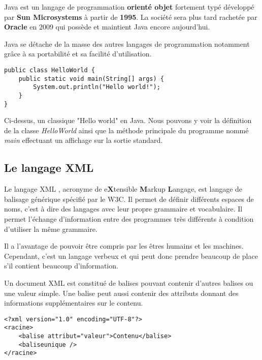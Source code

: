 \par 
Java \cite{java_oracle} est un langage de programmation \textbf{orienté objet} fortement typé développé par \textbf{Sun Microsystems} à partir de \textbf{1995}. La société sera plus tard rachetée par \textbf{Oracle} en 2009 qui possède et maintient Java encore aujourd'hui.

\par 
Java se détache de la masse des autres langages de programmation notamment grâce à sa portabilité et sa facilité d'utilisation.

\begin{lstlisting}[caption=Hello world en java]
public class HelloWorld {
    public static void main(String[] args) {
        System.out.println("Hello world!");
    }
}
\end{lstlisting}

\par
Ci-dessus, un classique "Hello world" en Java. Nous pouvons y voir la définition de la classe \emph{HelloWorld} ainsi que la méthode principale du programme nommé \emph{main} effectuant un affichage sur la sortie standard.



\subsection{Le langage XML}

Le langage XML \cite{xml_w3c, xml_ocr}, acronyme de e\textbf{X}tensible \textbf{M}arkup \textbf{L}angage, est langage de balisage générique spécifié par le W3C. Il permet de définir différents espaces de noms, c'est à dire des langages avec leur propre grammaire et vocabulaire. Il permet l'échange d'information entre des programmes très différents à condition d'utiliser la même grammaire.

\par
Il a l'avantage de pouvoir être compris par les êtres humains et les machines. Cependant, c'est un langage verbeux et qui peut donc prendre beaucoup de place s'il contient beaucoup d'information.

\par
Un document XML est constitué de balises pouvant contenir d'autres balises ou une valeur simple. Une balise peut aussi contenir des attributs donnant des informations supplémentaires sur le contenu.

\begin{lstlisting}[caption=Exemple d'un document XML]
<?xml version="1.0" encoding="UTF-8"?>
<racine>
    <balise attribut="valeur">Contenu</balise>
    <baliseunique />
</racine>
\end{lstlisting}

